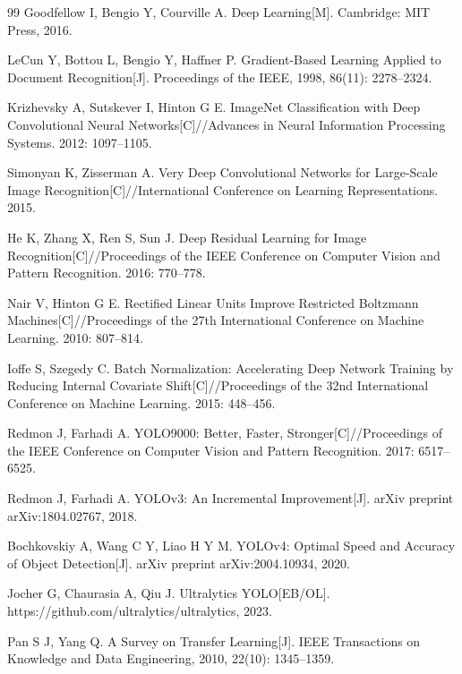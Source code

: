 \documentclass[UTF8,openany,12pt]{ctexbook}
\begin{document}
\backmatter
\begin{thebibliography}{99}
Goodfellow I, Bengio Y, Courville A. Deep Learning[M]. Cambridge: MIT Press, 2016.

LeCun Y, Bottou L, Bengio Y, Haffner P. Gradient-Based Learning Applied to Document Recognition[J]. Proceedings of the IEEE, 1998, 86(11): 2278--2324.

Krizhevsky A, Sutskever I, Hinton G E. ImageNet Classification with Deep Convolutional Neural Networks[C]//Advances in Neural Information Processing Systems. 2012: 1097--1105.

Simonyan K, Zisserman A. Very Deep Convolutional Networks for Large-Scale Image Recognition[C]//International Conference on Learning Representations. 2015.

He K, Zhang X, Ren S, Sun J. Deep Residual Learning for Image Recognition[C]//Proceedings of the IEEE Conference on Computer Vision and Pattern Recognition. 2016: 770--778.

Nair V, Hinton G E. Rectified Linear Units Improve Restricted Boltzmann Machines[C]//Proceedings of the 27th International Conference on Machine Learning. 2010: 807--814.

Ioffe S, Szegedy C. Batch Normalization: Accelerating Deep Network Training by Reducing Internal Covariate Shift[C]//Proceedings of the 32nd International Conference on Machine Learning. 2015: 448--456.

Redmon J, Farhadi A. YOLO9000: Better, Faster, Stronger[C]//Proceedings of the IEEE Conference on Computer Vision and Pattern Recognition. 2017: 6517--6525.

Redmon J, Farhadi A. YOLOv3: An Incremental Improvement[J]. arXiv preprint arXiv:1804.02767, 2018.

Bochkovskiy A, Wang C Y, Liao H Y M. YOLOv4: Optimal Speed and Accuracy of Object Detection[J]. arXiv preprint arXiv:2004.10934, 2020.

Jocher G, Chaurasia A, Qiu J. Ultralytics YOLO[EB/OL]. https://github.com/ultralytics/ultralytics, 2023.

Pan S J, Yang Q. A Survey on Transfer Learning[J]. IEEE Transactions on Knowledge and Data Engineering, 2010, 22(10): 1345--1359.


\end{thebibliography}
\end{document}

